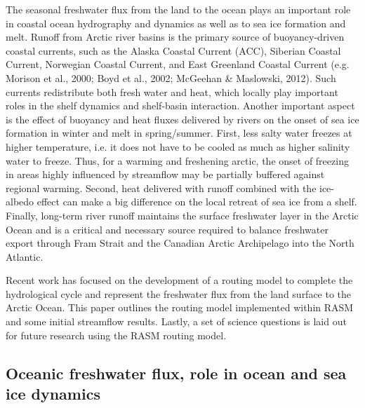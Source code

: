 The seasonal freshwater flux from the land to the ocean plays an important role in coastal ocean hydrography and dynamics as well as to sea ice formation and melt.
Runoff from Arctic river basins is the primary source of buoyancy-driven coastal currents, such as the Alaska Coastal Current (ACC), Siberian Coastal Current, Norwegian Coastal Current, and East Greenland Coastal Current (e.g. Morison et al., 2000; Boyd et al., 2002; McGeehan & Maslowski, 2012).
Such currents redistribute both fresh water and heat, which locally play important roles in the shelf dynamics and shelf-basin interaction. Another important aspect is the effect of buoyancy and heat fluxes delivered by rivers on the onset of sea ice formation in winter and melt in spring/summer.
First, less salty water freezes at higher temperature, i.e. it does not have to be cooled as much as higher salinity water to freeze.
Thus, for a warming and freshening arctic, the onset of freezing in areas highly influenced by streamflow may be partially buffered against regional warming.
Second, heat delivered with runoff combined with the ice-albedo effect can make a big difference on the local retreat of sea ice from a shelf.
Finally, long-term river runoff maintains the surface freshwater layer in the Arctic Ocean and is a critical and necessary source required to balance freshwater export through Fram Strait and the Canadian Arctic Archipelago into the North Atlantic.

Recent work has focused on the development of a routing model to complete the hydrological cycle and represent the freshwater flux from the land surface to the Arctic Ocean.
This paper outlines the routing model implemented within RASM and some initial streamflow results.
Lastly, a set of science questions is laid out for future research using the RASM routing model.
  
\subsection{Oceanic freshwater flux, role in ocean and sea ice dynamics}


